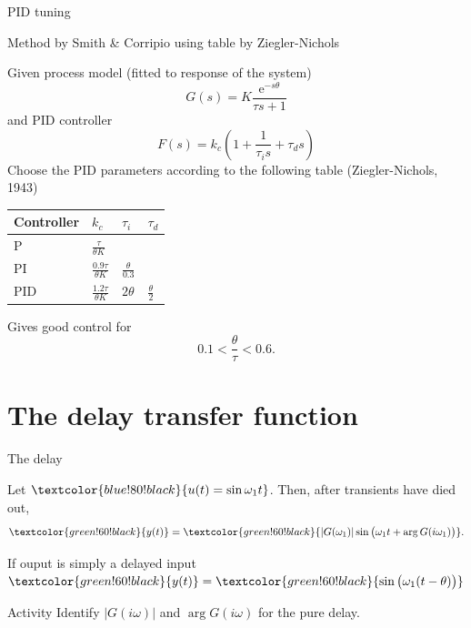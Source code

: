 \documentclass[presentation,aspectratio=169, usenames, dvipsnames]{beamer}
\def\ucolor{blue!80!black}
\def\ycolor{green!60!black}
\newcommand*{\incolor}[1]{\textcolor{\ucolor}{#1}}
\newcommand*{\outcolor}[1]{\textcolor{\ycolor}{#1}}
\begin{document}
\begin{frame}[label={sec:org168e46f}]{PID tuning}
\end{frame}
\begin{frame}[label={sec:org974319e}]{Method by Smith \& Corripio using table by Ziegler-Nichols}
\small

Given process model (fitted to response of the system) \[ G(s) = K \frac{\mathrm{e}^{-s\theta}}{\tau s + 1} \] and PID controller
   \[ F(s) = k_c\left( 1 + \frac{1}{\tau_i s} + \tau_d s\right) \]
   Choose the PID parameters according to the following table (Ziegler-Nichols, 1943)
   \begin{center}
   \setlength{\tabcolsep}{20pt}
   \renewcommand{\arraystretch}{1.5}
   \begin{tabular}{llll}
   Controller & \(k_c\) & \(\tau_i\) & \(\tau_d\)\\
  \hline\hline
  P & \(\frac{\tau}{\theta K}\) &  & \\
  PI & \(\frac{0.9\tau}{\theta K}\) & \(\frac{\theta}{0.3}\) & \\
  PID & \(\frac{1.2\tau}{\theta K}\) & \(2\theta\) & \(\frac{\theta}{2}\)\\
  \hline
\end{tabular}
\end{center}

Gives good control for \[0.1 < \frac{\theta}{\tau} < 0.6.\]
\end{frame}


\section{The delay transfer function}
\label{sec:org13c8ece}

\begin{frame}[label={sec:org4fe7098}]{The delay}
\begin{center}
\end{center}

Let \(\incolor{u(t) = \sin\omega_1 t}\). Then, after transients have died out,
\[ \outcolor{y(t)}= \outcolor{|G(\omega_1)| \sin \big( \omega_1 t + \arg G(i\omega_1)\big)}. \]

\pause
\alert{If ouput is simply a delayed input} \(\outcolor{y(t)}= \outcolor{ \sin \big( \omega_1 (t - \theta) \big)}\)

\pause
\alert{Activity} 
Identify \(|G(i\omega)|\) and \(\arg G(i\omega)\) for the pure delay.
\end{frame}
\end{document}
